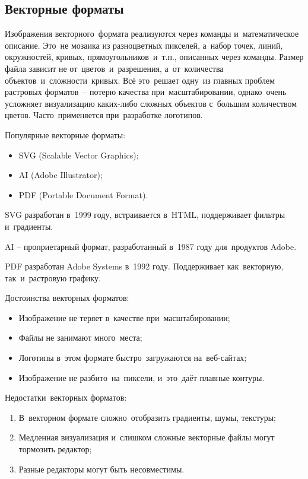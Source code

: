 \documentclass{ou}
\begin{document}
\subsection{Векторные форматы}
Изображения векторного~формата реализуются через команды и~математическое описание. Это~не мозаика из разноцветных пикселей, а~набор точек, линий, окружностей, кривых, прямоугольников~и~т.п., описанных через команды. Размер файла зависит не от~цветов~и~разрешения, а~от~количества объектов~и~сложности~кривых. Всё это~решает одну~из главных проблем растровых форматов~-- потерю качества при~масштабировании, однако~очень усложняет визуализацию каких-либо сложных объектов с~большим количеством цветов. Часто~применяется при~разработке логотипов.

Популярные векторные форматы: 

\begin{itemize}[label=-, itemindent=2em, nosep]
\item SVG (Scalable Vector Graphics);
\item AI (Adobe Illustrator);
\item PDF (Portable Document Format).
\end{itemize}

SVG разработан в~1999 году, встраивается в~HTML, поддерживает фильтры и~градиенты.

AI -- проприетарный формат, разработанный в~1987 году для~продуктов Adobe.

PDF разработан Adobe Systems в~1992 году. Поддерживает как~векторную, так~и~растровую графику.

Достоинства векторных форматов:
\begin{itemize}[label=-, itemindent=2em, nosep]
\item Изображение не теряет в~качестве при~масштабировании;
\item Файлы не занимают много~места;
\item Логотипы в~этом формате быстро~загружаются на~веб-сайтах;
\item Изображение не разбито~на~пиксели, и~это~даёт плавные контуры.
\end{itemize}

Недостатки~векторных форматов:
\begin{enumerate}[itemindent=2em, nosep, label=\arabic*), labelsep=0.5em]
\item В~векторном формате сложно~отобразить градиенты, шумы, текстуры;
\item Медленная визуализация и~слишком сложные векторные файлы могут тормозить редактор;
\item Разные редакторы могут быть несовместимы.
\end{enumerate}
\end{document}
